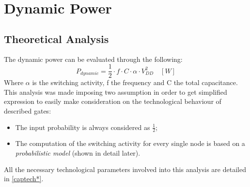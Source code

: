 \documentclass[12pt,  english, makeidx, a4paper, titlepage, oneside]{article}
\begin{document}
\newpage

\section{Dynamic Power}
\subsection{Theoretical Analysis}
The dynamic power can be evaluated through the following:
\begin{equation}
P_{dynamic}=\frac{1}{2} \cdot f \cdot C \cdot \alpha \cdot V_{DD}^{2} \quad [W]
\end{equation}
Where $\alpha$ is the switching activity, f the frequency and C the  total capacitance.\\
This analysis was made imposing two assumption in order to get simplified expression to easily make consideration on the technological behaviour of described gates:
\begin{itemize}
	\item The input probability is always considered as $\frac{1}{2}$;
	\item The computation of the switching activity for every single node is based on a \textit{probabilistic model} (shown in detail later). 
\end{itemize}   
All the necessary technological parameters involved into this analysis are detailed in \ref{captech*}.
\end{document}
